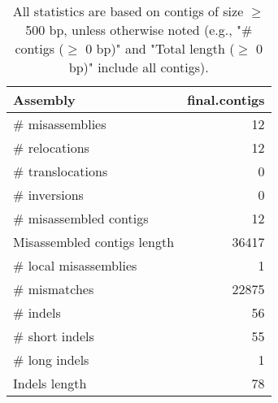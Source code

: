 \documentclass[12pt,a4paper]{article}
\begin{document}
\begin{table}[ht]
\begin{center}
\caption{All statistics are based on contigs of size $\geq$ 500 bp, unless otherwise noted (e.g., "\# contigs ($\geq$ 0 bp)" and "Total length ($\geq$ 0 bp)" include all contigs).}
\begin{tabular}{|l*{1}{|r}|}
\hline
Assembly & final.contigs \\ \hline
\# misassemblies & 12 \\ \hline
\hspace{5mm}\# relocations & 12 \\ \hline
\hspace{5mm}\# translocations & 0 \\ \hline
\hspace{5mm}\# inversions & 0 \\ \hline
\# misassembled contigs & 12 \\ \hline
Misassembled contigs length & 36417 \\ \hline
\# local misassemblies & 1 \\ \hline
\# mismatches & 22875 \\ \hline
\# indels & 56 \\ \hline
\hspace{5mm}\# short indels & 55 \\ \hline
\hspace{5mm}\# long indels & 1 \\ \hline
Indels length & 78 \\ \hline
\end{tabular}
\end{center}
\end{table}
\end{document}
